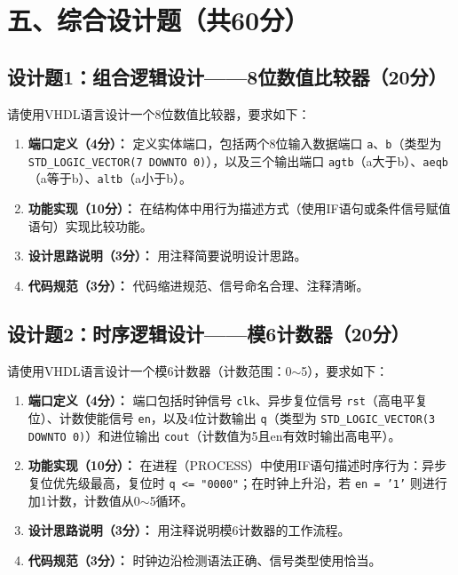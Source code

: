 \section{五、综合设计题（共60分）}

\subsection{设计题1：组合逻辑设计——8位数值比较器（20分）}

请使用VHDL语言设计一个8位数值比较器，要求如下：

\begin{enumerate}[label=(\arabic*)]
\item \textbf{端口定义（4分）：} 定义实体端口，包括两个8位输入数据端口 \texttt{a}、\texttt{b}（类型为 \texttt{STD\_LOGIC\_VECTOR(7 DOWNTO 0)}），以及三个输出端口 \texttt{agtb}（a大于b）、\texttt{aeqb}（a等于b）、\texttt{altb}（a小于b）。
\item \textbf{功能实现（10分）：} 在结构体中用行为描述方式（使用IF语句或条件信号赋值语句）实现比较功能。
\item \textbf{设计思路说明（3分）：} 用注释简要说明设计思路。
\item \textbf{代码规范（3分）：} 代码缩进规范、信号命名合理、注释清晰。
\end{enumerate}

\subsection{设计题2：时序逻辑设计——模6计数器（20分）}

请使用VHDL语言设计一个模6计数器（计数范围：0$\sim$5），要求如下：

\begin{enumerate}[label=(\arabic*)]
\item \textbf{端口定义（4分）：} 端口包括时钟信号 \texttt{clk}、异步复位信号 \texttt{rst}（高电平复位）、计数使能信号 \texttt{en}，以及4位计数输出 \texttt{q}（类型为 \texttt{STD\_LOGIC\_VECTOR(3 DOWNTO 0)}）和进位输出 \texttt{cout}（计数值为5且en有效时输出高电平）。
\item \textbf{功能实现（10分）：} 在进程（PROCESS）中使用IF语句描述时序行为：异步复位优先级最高，复位时 \texttt{q <= "0000"}；在时钟上升沿，若 \texttt{en = '1'} 则进行加1计数，计数值从0$\sim$5循环。
\item \textbf{设计思路说明（3分）：} 用注释说明模6计数器的工作流程。
\item \textbf{代码规范（3分）：} 时钟边沿检测语法正确、信号类型使用恰当。
\end{enumerate}

